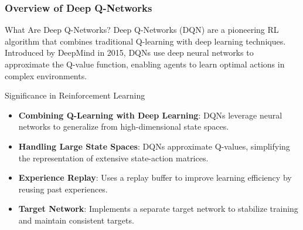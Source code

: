 \documentclass[aspectratio=169]{beamer}
\begin{document}
\frame{\titlepage}

\begin{frame}[fragile]
    \maketitle
\end{frame}

\begin{frame}[fragile]
    \frametitle{Overview of Deep Q-Networks}
    
    \begin{block}{What Are Deep Q-Networks?}
        Deep Q-Networks (DQN) are a pioneering RL algorithm that combines traditional Q-learning with deep learning techniques. Introduced by DeepMind in 2015, DQNs use deep neural networks to approximate the Q-value function, enabling agents to learn optimal actions in complex environments.
    \end{block}
    
    \begin{block}{Significance in Reinforcement Learning}
        \begin{itemize}
            \item \textbf{Combining Q-Learning with Deep Learning}: DQNs leverage neural networks to generalize from high-dimensional state spaces.
            \item \textbf{Handling Large State Spaces}: DQNs approximate Q-values, simplifying the representation of extensive state-action matrices.
            \item \textbf{Experience Replay}: Uses a replay buffer to improve learning efficiency by reusing past experiences.
            \item \textbf{Target Network}: Implements a separate target network to stabilize training and maintain consistent targets.
        \end{itemize}
    \end{block}
\end{frame}
\end{document}
